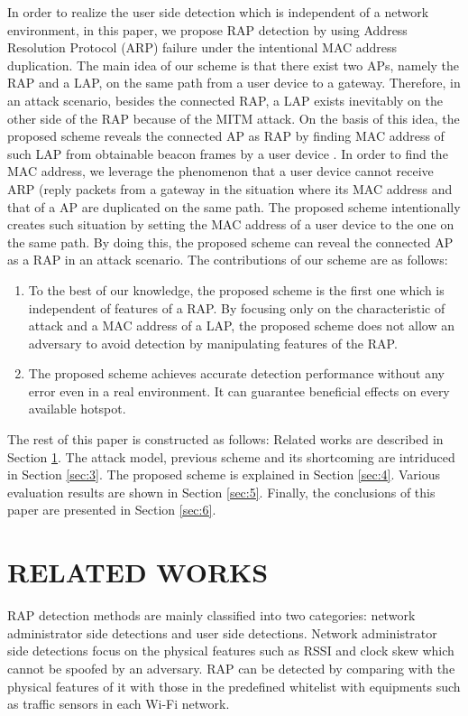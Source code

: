 \documentclass[conference]{IEEEtran}
\begin{document}
In order to realize the user side detection which is independent of a network environment, in this paper, we propose RAP detection by using Address Resolution Protocol (ARP) failure under the intentional MAC address duplication.
The main idea of our scheme is that there exist two APs, namely the RAP and a LAP, on the same path from a user device to a gateway.
Therefore, in an attack scenario, besides the connected RAP, a LAP exists inevitably on the other side of the RAP because of the MITM attack.
On the basis of this idea, the proposed scheme reveals the connected AP as RAP by finding MAC address of such LAP from obtainable beacon frames by a user device \cite{beacon}.
In order to find the MAC address, we leverage the phenomenon that a user device cannot receive ARP (reply packets from a gateway in the situation where its MAC address and that of a AP are duplicated on the same path.
The proposed scheme intentionally creates such situation by setting the MAC address of a user device to the one on the same path.
By doing this, the proposed scheme can reveal the connected AP as a RAP in an attack scenario.
The contributions of our scheme are as follows:
\begin{enumerate}
    \renewcommand{\labelenumi}{\arabic{enumi}).}
    \item To the best of our knowledge, the proposed scheme is the first one which is independent of features of a RAP. By focusing only on the characteristic of attack and a MAC address of a LAP, the proposed scheme does not allow an adversary to avoid detection by manipulating features of the RAP.
    \item The proposed scheme achieves accurate detection performance without any error even in a real environment. It can guarantee beneficial effects on every available hotspot.
\end{enumerate}
The rest of this paper is constructed as follows: Related works are described in Section \ref{sec:2}.
The attack model, previous scheme and its shortcoming are intriduced in Section \ref{sec:3}.
The proposed scheme is explained in Section \ref{sec:4}.
Various evaluation results are shown in Section \ref{sec:5}.
Finally, the conclusions of this paper are presented in Section \ref{sec:6}.

\section{RELATED WORKS}\label{sec:2}
RAP detection methods are mainly classified into two categories: network administrator side detections and user side detections.
Network administrator side detections focus on the physical features such as RSSI and clock skew which cannot be spoofed by an adversary.
RAP can be detected by comparing with the physical features of it with those in the predefined whitelist with equipments such as traffic sensors in each Wi-Fi network.
\end{document}
